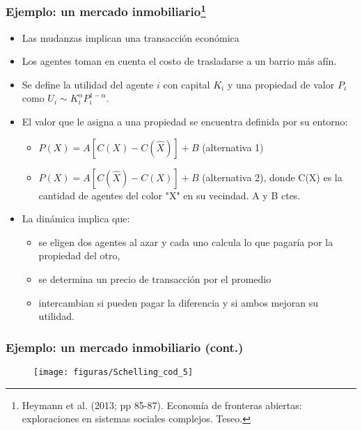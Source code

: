 \documentclass[11pt]{beamer}
\begin{document}
\begin{frame}
	\frametitle{Ejemplo: un mercado inmobiliario\footnote{Heymann et al. (2013; pp 85-87). Economía de fronteras abiertas: exploraciones en sistemas sociales complejos. Teseo.}}
\begin{itemize} \small
	\item Las mudanzas implican una transacción económica
	\item Los agentes toman en cuenta el costo de trasladarse a un barrio más afín.
	\item Se define la utilidad del agente $i$ con capital $K_i$ y una propiedad de valor $P_i$ como $U_i\sim K_i^{\alpha}P_i^{1-\alpha}$.
	\item El valor que le asigna a una propiedad se encuentra definida por su entorno:
	\begin{itemize} \footnotesize
		\item $P(X)=A[C(X)-C(\hat{X})]+B$ (alternativa 1)
		\item $P(X)=A[C(\hat{X})- C(X)]+B$ (alternativa 2), donde C(X) es la cantidad de agentes del color "X" en su vecindad. A y B ctes. 
	\end{itemize}
\item La dinámica implica que:
\begin{itemize} \footnotesize
	\item  se eligen dos agentes al azar y cada uno calcula lo que pagaría por la propiedad del otro, 
	\item se determina un precio de transacción por el promedio
	\item intercambian si pueden pagar la diferencia y si ambos mejoran su utilidad.
\end{itemize}	
\end{itemize}
\end{frame}

\begin{frame}
	\frametitle{Ejemplo: un mercado inmobiliario (cont.)}
	\begin{figure}
		\centering
		\texttt{[image: figuras/Schelling\_cod\_5]}
		\label{fig:schelling5}
	\end{figure}
\end{frame}
\end{document}
